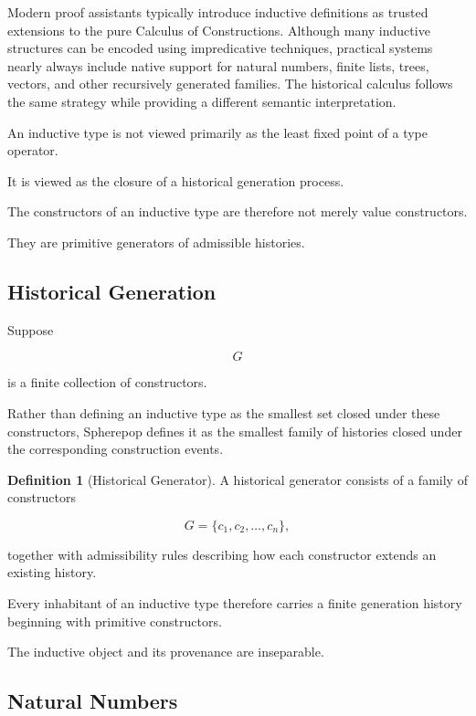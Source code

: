 \documentclass[12pt,oneside]{article}
\theoremstyle{definition}
\newtheorem{definition}[theorem]{Definition}
\theoremstyle{remark}
\begin{document}
Modern proof assistants typically introduce inductive definitions as trusted
extensions to the pure Calculus of Constructions. Although many inductive
structures can be encoded using impredicative techniques, practical systems
nearly always include native support for natural numbers, finite lists, trees,
vectors, and other recursively generated families. The historical calculus
follows the same strategy while providing a different semantic interpretation.

An inductive type is not viewed primarily as the least fixed point of a type
operator.

It is viewed as the closure of a historical generation process.

The constructors of an inductive type are therefore not merely value
constructors.

They are primitive generators of admissible histories.

\subsection{Historical Generation}

Suppose

\[
G
\]

is a finite collection of constructors.

Rather than defining an inductive type as the smallest set closed under these
constructors, Spherepop defines it as the smallest family of histories closed
under the corresponding construction events.

\begin{definition}[Historical Generator]

A historical generator consists of a family of constructors

\[
G
=
\{
c_1,
c_2,
\ldots,
c_n
\},
\]

together with admissibility rules describing how each constructor extends an
existing history.

\end{definition}

Every inhabitant of an inductive type therefore carries a finite generation
history beginning with primitive constructors.

The inductive object and its provenance are inseparable.

\subsection{Natural Numbers}
\end{document}
